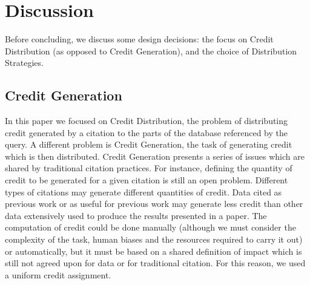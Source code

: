 \documentclass[preprint,12pt,sort&compress]{elsarticle}
\newcommand{\rtwo}[1]{\textcolor{reviewer2}{#1}}
\begin{document}
%
%
%
% 



\section{Discussion}
\label{sec:discussion}
Before concluding, we discuss some design decisions:  the focus on Credit Distribution (as opposed to Credit Generation), and the choice of Distribution Strategies.

\subsection{Credit Generation}
\label{subsec: generation}
\rtwo{In this paper we focused on Credit Distribution, the problem of distributing credit generated by a citation to the parts of the database referenced by the query.
A different problem is Credit Generation, the task of generating credit which is then distributed. 
Credit Generation presents a series of issues which are shared by traditional citation practices. For instance, defining the  quantity of credit to be generated for a given citation is still an open problem. Different types of citations may generate different quantities of credit. 
Data cited as previous work or as useful for previous work may generate less credit than other data extensively used to produce the results presented in a paper. The computation of credit could be done manually (although we must consider the complexity of the task, human biases and the resources required to carry it out) or automatically, but it must be based on a shared definition of impact which is still not agreed upon for data or for traditional citation. For this reason, we used a uniform credit assignment.
}
\end{document}
